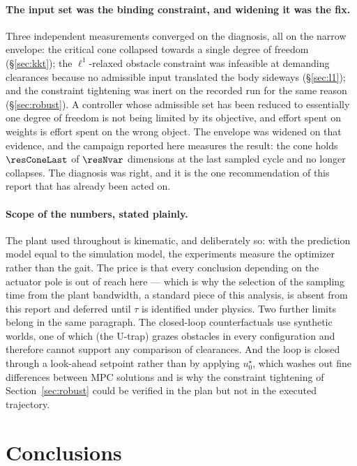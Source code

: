 \documentclass[11pt,a4paper]{article}
\begin{document}
\paragraph{The input set was the binding constraint, and widening it was the fix.} Three independent
measurements converged on the diagnosis, all on the narrow envelope: the critical cone collapsed towards a
single degree of freedom (\S\ref{sec:kkt}); the $\ell^1$-relaxed obstacle constraint was infeasible at
demanding clearances because no admissible input translated the body sideways (\S\ref{sec:l1}); and the
constraint tightening was inert on the recorded run for the same reason (\S\ref{sec:robust}). A controller
whose admissible set has been reduced to essentially one degree of freedom is not being limited by its
objective, and effort spent on weights is effort spent on the wrong object. The envelope was widened on that
evidence, and the campaign reported here measures the result: the cone holds $\resConeLast$ of $\resNvar$
dimensions at the last sampled cycle and no longer collapses. The diagnosis was right, and it is the one
recommendation of this report that has already been acted on.

\paragraph{Scope of the numbers, stated plainly.} The plant used throughout is kinematic, and deliberately
so: with the prediction model equal to the simulation model, the experiments measure the optimizer rather
than the gait. The price is that every conclusion depending on the actuator pole is out of reach here ---
which is why the selection of the sampling time from the plant bandwidth, a standard piece of this analysis,
is absent from this report and deferred until $\tau$ is identified under physics. Two further limits belong
in the same paragraph. The closed-loop counterfactuals use synthetic worlds, one of which (the U-trap) grazes
obstacles in every configuration and therefore cannot support any comparison of clearances. And the loop is
closed through a look-ahead setpoint rather than by applying $u^\star_0$, which washes out fine differences
between MPC solutions and is why the constraint tightening of Section~\ref{sec:robust} could be verified in
the plan but not in the executed trajectory.

\section{Conclusions}
\label{sec:conclusions}
\end{document}
